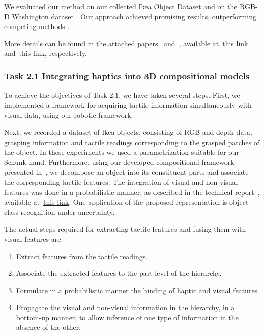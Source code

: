 \documentclass[a4paper,11pt,pdf]{pacmanreport}
\begin{document}
We evaluated our method on our collected Ikea Object Dataset and on the RGB-D Washington dataset \cite{rgbd-dataset}. Our approach achieved promising results, outperforming competing methods \cite{rel7}.


More details can be found in the attached papers~\cite{Rezapour2015LearningCVPR} and~\cite{Rezapour2015LearningICRA}, available at~\href{./attachedPapers/rezapouretal-cvpr2015.pdf}{this link} and~\href{./attachedPapers/rezapouretal-icra2015.pdf}{this link}, respectively.

\subsubsection{Task 2.1 Integrating haptics into 3D compositional models}

To achieve the objectives of Task 2.1, we have taken several steps. First, we implemented a framework for acquiring tactile information simultaneously with visual data, using our robotic framework. 

Next, we recorded a dataset of Ikea objects, consisting of RGB and depth data, grasping information and tactile readings corresponding to the grasped patches of the object. In these experiments we used a parametrization suitable for our Schunk hand. Furthermore, using our developed compositional framework presented in~\cite{Rezapour2015LearningCVPR}, we decompose an object into its constituent parts and associate the corresponding tactile features. The integration of visual and non-visual features was done in a probabilistic manner, as described in the technical report~\cite{Rezapour2015Multi}, available at~\href{./attachedPapers/rezapouretal-Tech2015.pdf}{this link}. One application of the proposed representation is object class recognition under uncertainty.

The actual steps required for extracting tactile features and fusing them with visual features are:
\begin{enumerate}

\item Extract features from the tactile readings.
\item Associate the extracted features to the part level of the hierarchy.
\item Formulate in a probabilistic manner the binding of haptic and visual features.
\item Propagate the visual and non-visual information in the
  hierarchy, in a bottom-up manner, to allow inference of one type of
  information in the absence of the other.
\end{enumerate}
\end{document}
